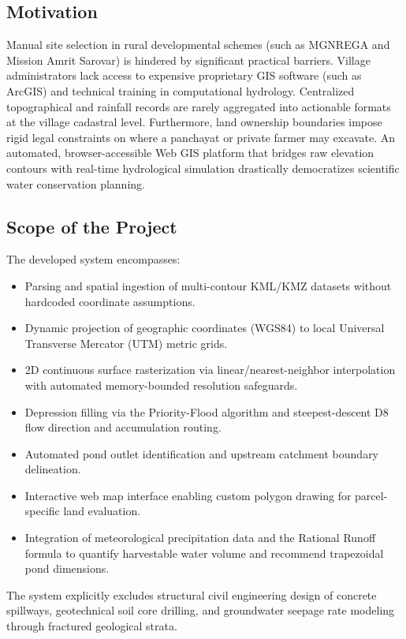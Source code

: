\documentclass[manuscript,screen,review]{acmart}
\begin{document}
\subsection{Motivation}
Manual site selection in rural developmental schemes (such as MGNREGA and Mission Amrit Sarovar) is hindered by significant practical barriers. Village administrators lack access to expensive proprietary GIS software (such as ArcGIS) and technical training in computational hydrology. Centralized topographical and rainfall records are rarely aggregated into actionable formats at the village cadastral level. Furthermore, land ownership boundaries impose rigid legal constraints on where a panchayat or private farmer may excavate. An automated, browser-accessible Web GIS platform that bridges raw elevation contours with real-time hydrological simulation drastically democratizes scientific water conservation planning.

\subsection{Scope of the Project}
The developed system encompasses:
\begin{itemize}
    \item Parsing and spatial ingestion of multi-contour KML/KMZ datasets without hardcoded coordinate assumptions.
    \item Dynamic projection of geographic coordinates (WGS84) to local Universal Transverse Mercator (UTM) metric grids.
    \item 2D continuous surface rasterization via linear/nearest-neighbor interpolation with automated memory-bounded resolution safeguards.
    \item Depression filling via the Priority-Flood algorithm and steepest-descent D8 flow direction and accumulation routing.
    \item Automated pond outlet identification and upstream catchment boundary delineation.
    \item Interactive web map interface enabling custom polygon drawing for parcel-specific land evaluation.
    \item Integration of meteorological precipitation data and the Rational Runoff formula to quantify harvestable water volume and recommend trapezoidal pond dimensions.
\end{itemize}
The system explicitly excludes structural civil engineering design of concrete spillways, geotechnical soil core drilling, and groundwater seepage rate modeling through fractured geological strata.
\end{document}
